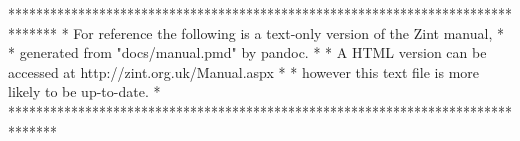 *******************************************************************************
* For reference the following is a text-only version of the Zint manual,      *
* generated from "docs/manual.pmd" by pandoc.                                 *
* A HTML version can be accessed at http://zint.org.uk/Manual.aspx            *
* however this text file is more likely to be up-to-date.                     *
*******************************************************************************
